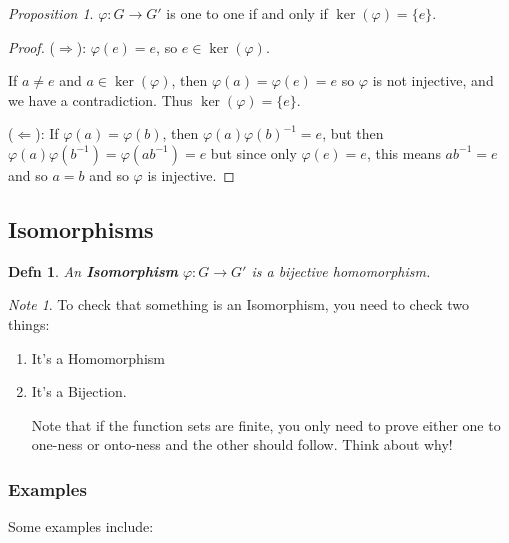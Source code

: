 \documentclass[12pt]{article}
\def\phi{\varphi}
\newtheorem{definition}{Defn}
\theoremstyle{remark}
\newtheorem{proposition}{Proposition}
\theoremstyle{remark}
\theoremstyle{remark}
\theoremstyle{remark}
\theoremstyle{remark}
\newtheorem*{note}{Note}
\begin{document}
\begin{proposition}
  $\phi: G \to G'$ is one to one if and only if $\ker(\phi) = \{e\}$.
\end{proposition}

\begin{proof}
  ($\Rightarrow$): $\phi(e) = e$, so $e \in \ker(\phi)$.

  If $a \ne e$ and $a \in \ker(\phi)$, then $\phi(a) = \phi(e) = e$ so $\phi$ is
  not injective, and we have a contradiction. Thus $\ker(\phi) = \{e\}$.

  ($\Leftarrow$): If $\phi(a) = \phi(b)$, then $\phi(a) \phi(b)^{-1} = e$, but
  then $\phi(a) \phi(b^{-1}) = \phi(a b^{-1}) = e$ but since only $\phi(e) = e$,
  this means $a b^{-1} = e$ and so $a = b$ and so $\phi$ is injective.
\end{proof}

\subsection{Isomorphisms}

\begin{definition}
	An {\bf Isomorphism} $\phi: G \to G'$ is a bijective homomorphism.
\end{definition}

\begin{note}
	To check that something is an Isomorphism, you need to check two things:

	\begin{enumerate}
		\item It's a Homomorphism
		\item It's a Bijection.

		      Note that if the function sets are finite, you only need to prove either
		      one to one-ness or onto-ness and the other should follow. Think about
		      why!
	\end{enumerate}
\end{note}

\subsubsection{Examples}

Some examples include:
\end{document}
